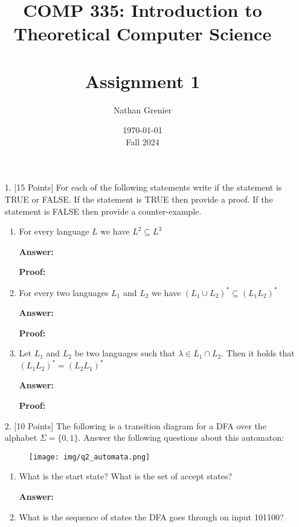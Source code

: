 \documentclass[12pt]{article}
\title{COMP 335: Introduction to Theoretical Computer Science\\
\ \\
Assignment 1}
\author{Nathan Grenier}
\date{\today \\ Fall 2024}
\begin{document}
\maketitle

\newpage

\begin{enumerate}

\item[1.] [15 Points] For each of the following statements write if the statement is TRUE or FALSE. If the statement is TRUE then provide a proof. If the statement is FALSE then provide a counter-example.

\begin{enumerate}
	
	\item For every language $L$ we have $L^2 \subseteq L^3$
	
	\noindent \textbf{Answer:}

	\noindent \textbf{Proof:} 
	
	\item For every two languages $L_1$ and $L_2$ we have $(L_1 \cup L_2)^* \subseteq (L_1L_2)^*$
	
	\noindent \textbf{Answer:}

	\noindent \textbf{Proof:} 

	\item Let $L_1$ and $L_2$ be two languages such that $\lambda \in L_1 \cap L_2$. Then it holds that $(L_1L_2)^* = (L_2L_1)^*$
	
	\noindent \textbf{Answer:}

	\noindent \textbf{Proof:} 
	
\end{enumerate}

\newpage

\item[2.] [10 Points] The following is a transition diagram for a DFA over the alphabet $\Sigma = \{0,1\}$. Answer the following questions about this automaton:

\begin{figure}[h!]
	\centering
	\texttt{[image: img/q2\_automata.png]}
\end{figure}

\begin{enumerate}
	\item What is the start state? What is the set of accept states?
	
	\noindent \textbf{Answer:}

	\item What is the sequence of states the DFA goes through on input 101100?
	

\end{enumerate}
\end{enumerate}
\end{document}
